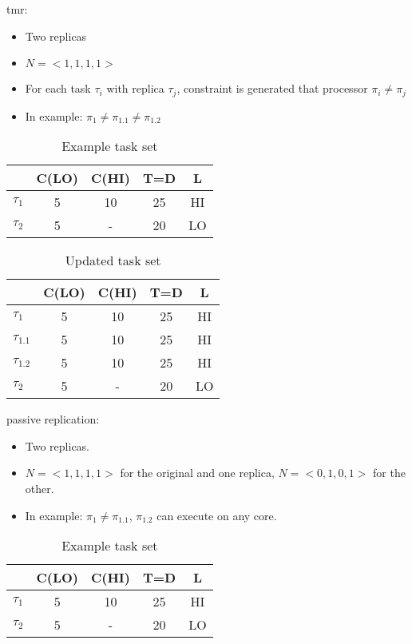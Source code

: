tmr:
\begin{itemize}
  \item Two replicas
  \item $N=<1,1,1,1>$
  \item For each task $\tau_i$ with replica $\tau_j$, constraint is generated that processor $\pi_i \ne \pi_j$
  \item In example: $\pi_1 \ne \pi_{1.1} \ne \pi_{1.2}$
\end{itemize}
\begin{table}
\centering
\caption{Example task set}
\begin{tabular}{@{}l|cccc@{}}
\toprule
		& C(LO) & C(HI) & T=D & L 	 \\\bottomrule
$\tau_1$ & 5 & 10 & 25 & HI  \\
$\tau_2$ & 5 & - & 20 & LO  \\
\end{tabular}
\end{table}

\begin{table}
\centering
\caption{Updated task set}
\begin{tabular}{@{}l|cccc@{}}
\toprule
		& C(LO) & C(HI) & T=D & L	 \\\bottomrule
$\tau_1$ & 5 & 10 & 25 & HI  \\
$\tau_{1.1}$ & 5 & 10 & 25 & HI  \\
$\tau_{1.2}$ & 5 & 10 & 25 & HI  \\
$\tau_2$ & 5 & - & 20 & LO  \\
\end{tabular}
\end{table}

passive replication:
\begin{itemize}
  \item Two replicas.
  \item $N=<1,1,1,1>$ for the original and one replica, $N=<0,1,0,1>$ for the other.
  \item In example: $\pi_1 \ne \pi_{1.1}$, $\pi_{1.2}$ can execute on any core.
\end{itemize}

\begin{table}
\centering
\caption{Example task set}
\begin{tabular}{@{}l|cccc@{}}
\toprule
		& C(LO) & C(HI) & T=D & L 	 \\\bottomrule
$\tau_1$ & 5 & 10 & 25 & HI  \\
$\tau_2$ & 5 & - & 20 & LO  \\
\end{tabular}
\end{table}

